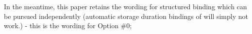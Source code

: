\documentclass{wg21}
\begin{document}
In the meantime, this paper retains the wording for  structured binding which can be pursued independently (automatic storage duration bindings of  will simply not work.) - this is the wording for Option \#0;
%
%
%
%
%
%
%
%
%
%
%
%
%
\end{document}
